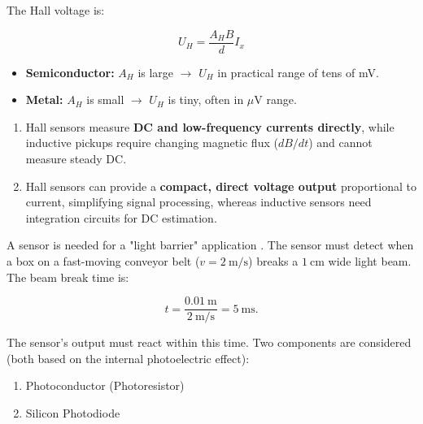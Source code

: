 

\begin{solutionblock}
The Hall voltage is:

\[
U_H = \frac{A_H B}{d} I_x
\]

\begin{itemize}
    \item \textbf{Semiconductor:} $A_H$ is large $\rightarrow$ $U_H$ in practical range of tens of mV.
    \item \textbf{Metal:} $A_H$ is small $\rightarrow$ $U_H$ is tiny, often in $\mu$V range.
\end{itemize}
\end{solutionblock}

\begin{solutionblock}
\begin{enumerate}
    \item Hall sensors measure \textbf{DC and low-frequency currents directly}, while inductive pickups require changing magnetic flux ($dB/dt$) and cannot measure steady DC.
    \item Hall sensors can provide a \textbf{compact, direct voltage output} proportional to current, simplifying signal processing, whereas inductive sensors need integration circuits for DC estimation.
\end{enumerate}
\end{solutionblock}




A sensor is needed for a "light barrier" application . The sensor must detect when a box on a fast-moving conveyor belt ($v = 2~\text{m/s}$) breaks a $1~\text{cm}$ wide light beam. The beam break time is:

\[
t = \frac{0.01~\text{m}}{2~\text{m/s}} = 5~\text{ms}.
\]

The sensor's output must react within this time. Two components are considered (both based on the internal photoelectric effect):

\begin{enumerate}
    \item Photoconductor (Photoresistor)  
    \item Silicon Photodiode
\end{enumerate}

